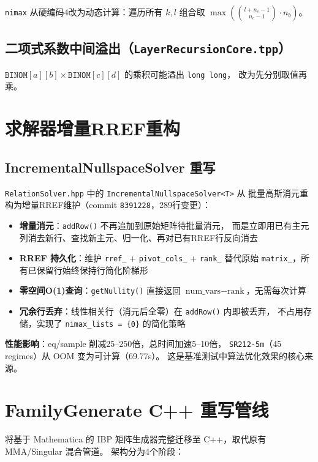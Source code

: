 \documentclass[12pt,a4paper]{article}
\begin{document}
\texttt{nimax} 从硬编码4改为动态计算：遍历所有 $k,l$ 组合取
$\max\left(\binom{l+n_e-1}{n_e-1} \cdot n_b\right)$。

\subsection{二项式系数中间溢出（\texttt{LayerRecursionCore.tpp}）}

$\texttt{BINOM}[a][b] \times \texttt{BINOM}[c][d]$ 的乘积可能溢出 \texttt{long long}，
改为先分别取值再乘。

\section{求解器增量RREF重构}

\subsection{IncrementalNullspaceSolver 重写}

\texttt{RelationSolver.hpp} 中的 \texttt{IncrementalNullspaceSolver<T>} 从
批量高斯消元重构为增量RREF维护（commit \texttt{8391228}，289行变更）：

\begin{itemize}[nosep]
    \item \textbf{增量消元}：\texttt{addRow()} 不再追加到原始矩阵待批量消元，
    而是立即用已有主元列消去新行、查找新主元、归一化、再对已有RREF行反向消去
    \item \textbf{RREF 持久化}：维护 \texttt{rref\_} + \texttt{pivot\_cols\_} + \texttt{rank\_}
    替代原始 \texttt{matrix\_}，所有已保留行始终保持行简化阶梯形
    \item \textbf{零空间O(1)查询}：\texttt{getNullity()} 直接返回
    $\text{num\_vars} - \text{rank}$，无需每次计算
    \item \textbf{冗余行丢弃}：线性相关行（消元后全零）在 \texttt{addRow()} 内即被丢弃，
    不占用存储，实现了 \texttt{nimax\_lists = \{0\}} 的简化策略
\end{itemize}

\textbf{性能影响}：eq/sample 削减25--250倍，总时间加速5--10倍，
\texttt{SR212-5m}（45 regimes）从 OOM 变为可计算（69.77s）。
这是基准测试中算法优化效果的核心来源。

\section{FamilyGenerate C++ 重写管线}

将基于 Mathematica 的 IBP 矩阵生成器完整迁移至 C++，取代原有 MMA/Singular 混合管道。
架构分为4个阶段：
\end{document}
